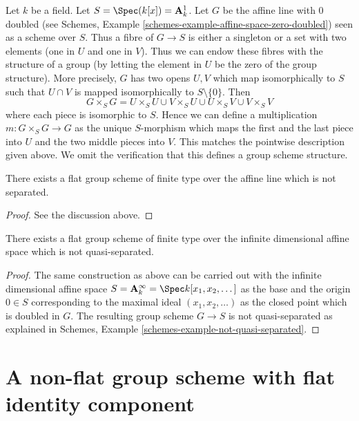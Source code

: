 \medskip\noindent
Let $k$ be a field. Let $S = \Spec(k[x]) = \mathbf{A}^1_k$.
Let $G$ be the affine line with $0$ doubled (see
Schemes, Example \ref{schemes-example-affine-space-zero-doubled})
seen as a scheme over $S$. Thus a fibre of $G \to S$ is either a
singleton or a set with two elements (one in $U$ and one in $V$).
Thus we can endow these fibres with the structure of a group (by
letting the element in $U$ be the zero of the group structure).
More precisely, $G$ has two opens $U, V$ which map isomorphically
to $S$ such that $U \cap V$ is mapped isomorphically to
$S \setminus \{0\}$. Then
$$
G \times_S G = U \times_S U \cup V \times_S U \cup
U \times_S V \cup V \times_S V
$$
where each piece is isomorphic to $S$. Hence we can define a multiplication
$m : G \times_S G \to G$ as the unique $S$-morphism which maps the first
and the last piece into $U$ and the two middle pieces into $V$. This matches
the pointwise description given above. We omit the
verification that this defines a group scheme structure.

\begin{lemma}
\label{lemma-non-separated-group-scheme}
There exists a flat group scheme of finite type over the affine line
which is not separated.
\end{lemma}

\begin{proof}
See the discussion above.
\end{proof}

\begin{lemma}
\label{lemma-non-quasi-separated-group-scheme}
There exists a flat group scheme of finite type over the infinite
dimensional affine space which is not quasi-separated.
\end{lemma}

\begin{proof}
The same construction as above can be carried out with the infinite dimensional
affine space $S = \mathbf{A}^\infty_k = \Spec k[x_1, x_2, \dotsc]$ as the base
and the origin $0 \in S$ corresponding to the maximal ideal
$(x_1, x_2, \ldots)$ as the closed point which is doubled in $G$.
The resulting group scheme $G \rightarrow S$ is 
not quasi-separated as explained in
Schemes, Example \ref{schemes-example-not-quasi-separated}. 
\end{proof}



\section{A non-flat group scheme with flat identity component}
\label{section-non-flat-group-scheme}

